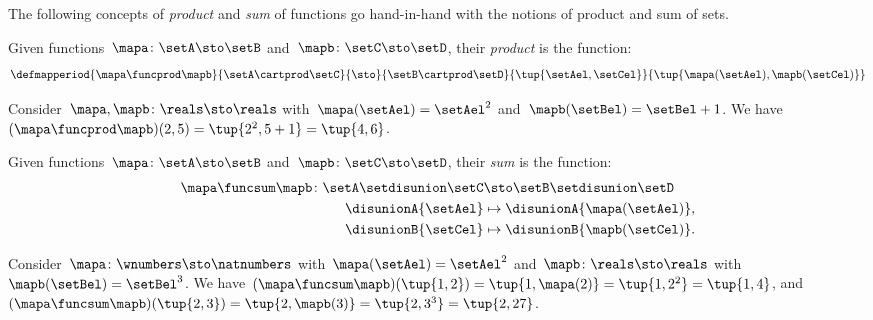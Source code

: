 The following concepts of \emph{product} and \emph{sum} of functions go hand-in-hand with the notions of product and sum of sets.

\begin{ctdefinition}
    \label{def:product-of-functions}
    Given functions~$\mapa\colon \setA \sto \setB$ and~$\mapb\colon \setC \sto \setD$, their \emph{product} is the function:
    \begin{equation}
        \defmapperiod{
            \mapa \funcprod \mapb
        }{
            \setA \cartprod \setC
        }{
            \sto
        }{
            \setB\cartprod \setD
        }{
            \tup{\setAel, \setCel}
        }{
            \tup{\mapa(\setAel),\mapb(\setCel)}
        }
    \end{equation}
\end{ctdefinition}

\begin{example}
    Consider~$\mapa,\mapb \colon \reals \sto \reals$ with~$\mapa(\setAel)=\setAel^2$ and~$\mapb(\setBel)=\setBel+1$.
    We have~$(\mapa \funcprod \mapb)(2,5)=\tup{2^2,5+1}=\tup{4,6}$.
\end{example}

\begin{ctdefinition}
    \label{def:sum-of-functions}
    Given functions~$\mapa\colon \setA \sto \setB$ and~$\mapb\colon \setC \sto \setD$, their \emph{sum} is the function:
    \begin{equation}
        \begin{aligned}
            \mapa \funcsum \mapb \colon \setA \setdisunion \setC & \sto \setB\setdisunion \setD \\
            \disunionA{\setAel}                                  & \mapsto \disunionA{\mapa(\setAel)}, \\
            \disunionB{\setCel}                                  & \mapsto \disunionB{\mapb(\setCel)}.
            \\
        \end{aligned}
    \end{equation}
\end{ctdefinition}

\begin{example}
    Consider~$\mapa\colon \wnumbers \sto \natnumbers$ with~$\mapa(\setAel)=\setAel^2$ and~$\mapb\colon \reals \sto \reals$ with~$\mapb(\setBel)=\setBel^3$.
    We have~$(\mapa \funcsum \mapb)(\tup{1,2})=\tup{1,\mapa(2)}=\tup{1,2^2}=\tup{1,4}$, and~$(\mapa \funcsum \mapb)(\tup{2,3})=\tup{2,\mapb(3)}=\tup{2,3^3} = \tup{2,27}$.
\end{example}

